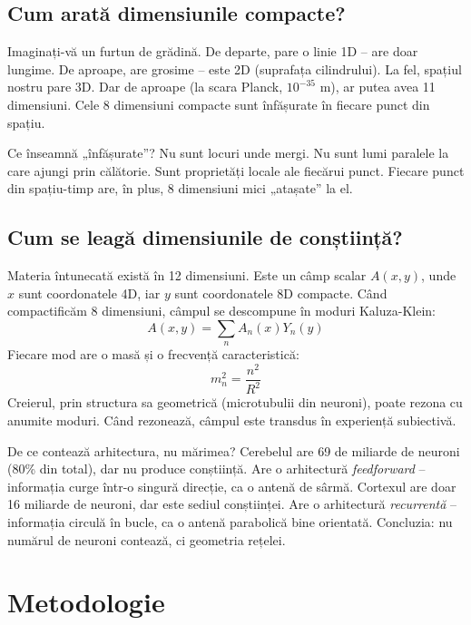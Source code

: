\documentclass[11pt,a4paper]{article}
\begin{document}
\subsection{Cum arată dimensiunile compacte?}
Imaginați-vă un furtun de grădină. De departe, pare o linie 1D – are doar lungime. De aproape, are grosime – este 2D (suprafața cilindrului). La fel, spațiul nostru pare 3D. Dar de aproape (la scara Planck, $10^{-35}$ m), ar putea avea 11 dimensiuni. Cele 8 dimensiuni compacte sunt înfășurate în fiecare punct din spațiu.

Ce înseamnă „înfășurate”? Nu sunt locuri unde mergi. Nu sunt lumi paralele la care ajungi prin călătorie. Sunt proprietăți locale ale fiecărui punct. Fiecare punct din spațiu-timp are, în plus, 8 dimensiuni mici „atașate” la el.

\subsection{Cum se leagă dimensiunile de conștiință?}
Materia întunecată există în 12 dimensiuni. Este un câmp scalar $A(x,y)$, unde $x$ sunt coordonatele 4D, iar $y$ sunt coordonatele 8D compacte. Când compactificăm 8 dimensiuni, câmpul se descompune în moduri Kaluza-Klein: 
\begin{equation}
A(x,y) = \sum_n A_n(x) Y_n(y)
\end{equation}
Fiecare mod are o masă și o frecvență caracteristică:
\begin{equation}
m_n^2 = \frac{n^2}{R^2}
\end{equation}
Creierul, prin structura sa geometrică (microtubulii din neuroni), poate rezona cu anumite moduri. Când rezonează, câmpul este transdus în experiență subiectivă.

De ce contează arhitectura, nu mărimea? Cerebelul are 69 de miliarde de neuroni (80\% din total), dar nu produce conștiință. Are o arhitectură \textit{feedforward} – informația curge într-o singură direcție, ca o antenă de sârmă. Cortexul are doar 16 miliarde de neuroni, dar este sediul conștiinței. Are o arhitectură \textit{recurrentă} – informația circulă în bucle, ca o antenă parabolică bine orientată. Concluzia: nu numărul de neuroni contează, ci geometria rețelei.

\section{Metodologie}
\end{document}
